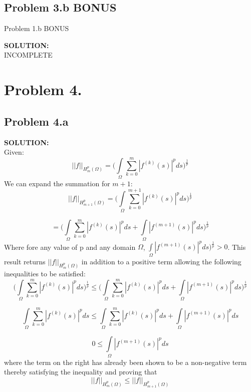 \documentclass[10pt,a4paper]{article}
\begin{document}
\subsection{Problem 3.b BONUS}
Problem 1.b BONUS
\begin{tcolorbox}
\textbf{SOLUTION:}\\
INCOMPLETE
\end{tcolorbox}

\section{Problem 4.}
\subsection{Problem 4.a}
\begin{tcolorbox}
\textbf{SOLUTION:}\\
Given:
$$||f||_{H_m^p(\Omega)}=\big( \int\limits_\Omega \sum\limits_{k=0}^{m}|f^{(k)}(s)|^p ds\big)^{\frac{1}{p}}$$
We can expand the summation for $m+1$:
$$||f||_{H_{m+1}^p(\Omega)}
=\big( \int\limits_\Omega \sum\limits_{k=0}^{m+1}|f^{(k)}(s)|^p ds \big)^{\frac{1}{p}}$$

$$=\big( \int\limits_\Omega \sum\limits_{k=0}^{m}|f^{(k)}(s)|^p ds 
+\int\limits_\Omega |f^{(m+1)}(s)|^p ds \big)^{\frac{1}{p}}$$
Where fore any value of p and any domain $\Omega$, $\int\limits_\Omega |f^{(m+1)}(s)|^p ds \big)^{\frac{1}{p}}> 0$.  This result returns $||f||_{H_{m}^p(\Omega)}$ in addition to a positive term allowing the following inequalities to be satisfied:
$$\big( \int\limits_\Omega \sum\limits_{k=0}^{m}|f^{(k)}(s)|^p ds \big)^{\frac{1}{p}}
\leq \big( \int\limits_\Omega \sum\limits_{k=0}^{m}|f^{(k)}(s)|^p ds 
+\int\limits_\Omega |f^{(m+1)}(s)|^p ds \big)^{\frac{1}{p}}$$

$$\int\limits_\Omega \sum\limits_{k=0}^{m}|f^{(k)}(s)|^p ds 
\leq \int\limits_\Omega \sum\limits_{k=0}^{m}|f^{(k)}(s)|^p ds 
+\int\limits_\Omega |f^{(m+1)}(s)|^p ds$$

$$0\leq \int\limits_\Omega |f^{(m+1)}(s)|^p ds$$
where the term on the right has already been shown to be a non-negative term thereby satisfying the inequality and proving that
$$||f||_{H_m^p(\Omega)} \leq ||f||_{H_{m+1}^p(\Omega)}$$
\end{tcolorbox}
\end{document}
